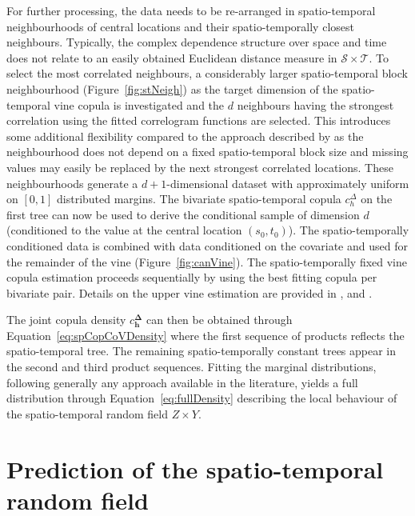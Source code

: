 \documentclass[article,nojss]{jss}
\begin{document}
For further processing, the data needs to be re-arranged in spatio-temporal neighbourhoods of central locations and their spatio-temporally closest neighbours. Typically, the complex dependence structure over space and time does not relate to an easily obtained Euclidean distance measure in $\mathcal{S}\times\mathcal{T}$. To select the most correlated neighbours, a considerably larger spatio-temporal block neighbourhood (Figure~\ref{fig:stNeigh}) as the target dimension of the spatio-temporal vine copula is investigated and the $d$ neighbours having the strongest correlation using the fitted correlogram functions are selected. This introduces some additional flexibility compared to the approach described by \citet{Graler2012a} as the neighbourhood does not depend on a fixed spatio-temporal block size and missing values may easily be replaced by the next strongest correlated locations. These neighbourhoods generate a $d+1$-dimensional dataset with approximately uniform on $[0,1]$ distributed margins. The bivariate spatio-temporal copula $c^\Delta_{h}$ on the first tree can now be used to derive the conditional sample of dimension $d$ (conditioned to the value at the central location $(s_0,t_0)$). The spatio-temporally conditioned data is combined with data conditioned on the covariate and used for the remainder of the vine (Figure~\ref{fig:canVine}). The spatio-temporally fixed vine copula estimation proceeds sequentially by using the best fitting copula per bivariate pair. Details on the upper vine estimation are provided in \citet{Aas2009}, \citet{Czado2012} and \citet{Dissmann2013}.

The joint copula density $c^\mathbf{\Delta}_\mathbf{h}$ can then be obtained through Equation~\ref{eq:spCopCoVDensity} where the first sequence of products reflects the spatio-temporal tree. The remaining spatio-temporally constant trees appear in the second and third product sequences. Fitting the marginal distributions, following generally any approach available in the literature, yields a full distribution through Equation~\ref{eq:fullDensity} describing the local behaviour of the spatio-temporal random field $Z\times Y$.
\pagebreak

\section{Prediction of the spatio-temporal random field}
\label{sec:predSim}
\end{document}
